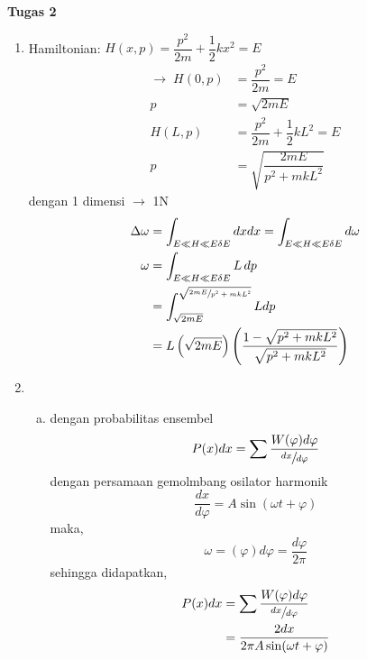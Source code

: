 \textbf{Tugas 2}
\begin{enumerate}
    \item Hamiltonian: $H(x,p)=\dfrac{p^2}{2m}+\dfrac{1}{2}kx^2=E$
    \begin{equation*}
        \begin{split}
            \rightarrow\;H(0,p)&=\dfrac{p^2}{2m}=E\\
            p&=\sqrt{2mE}\\
            H(L,p)&=\dfrac{p^2}{2m}+\dfrac{1}{2}kL^2=E\\
            p&=\sqrt{\dfrac{2mE}{p^2+mkL^2}}
        \end{split}
    \end{equation*}
    dengan 1 dimensi $\rightarrow$ 1N
    \begin{equation*}
        \begin{split}
            \Delta\omega&=\int_{E\ll H\ll E\delta E} dxdx=\int_{E\ll H\ll E\delta E} d\omega\\
            \omega&=\int_{E\ll H\ll E\delta E}L\,dp\\
            &=\int_{\sqrt{2mE}}^{\sqrt{\sfrac{2mE}{p^2+mkL^2}}}Ldp\\
            &=L\left(\sqrt{2mE}\right)\left(\dfrac{1-\sqrt{p^2+mkL^2}}{\sqrt{p^2+mkL^2}}\right)
        \end{split}
    \end{equation*}
    \item 
    \begin{enumerate}[(a)]
        \item dengan probabilitas ensembel
        \begin{equation*}
            P(x)dx=\sum\dfrac{W(\varphi) d\varphi}{\sfrac{dx}{d\varphi}}
        \end{equation*}
        dengan persamaan gemolmbang osilator harmonik
        \begin{equation*}
            \dfrac{dx}{d\varphi}=A\sin(\omega t+\varphi)
        \end{equation*}
        maka,
        \begin{equation*}
            \omega=(\varphi)d\varphi=\dfrac{d\varphi}{2\pi}
        \end{equation*}
        sehingga didapatkan,
        \begin{equation*}
            \begin{split}
                P(x)dx&=\sum\dfrac{W(\varphi) d\varphi}{\sfrac{dx}{d\varphi}}\\
                &=\dfrac{2dx}{2\pi A\sin(\omega t+\varphi)}\\

\end{split}
\end{equation*}
\end{enumerate}
\end{enumerate}
